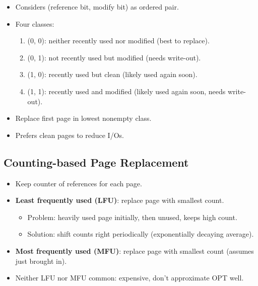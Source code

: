 \begin{itemize}
\begin{itemize}
        \item Considers (reference bit, modify bit) as ordered pair.
        \item Four classes:
        \begin{enumerate}
            \item (0, 0): neither recently used nor modified (best to replace).
            \item (0, 1): not recently used but modified (needs write-out).
            \item (1, 0): recently used but clean (likely used again soon).
            \item (1, 1): recently used and modified (likely used again soon, needs write-out).
        \end{enumerate}
        \item Replace first page in lowest nonempty class.
        \item Prefers clean pages to reduce I/Os.
    \end{itemize}
\end{itemize}

\subsection{Counting-based Page Replacement}
\begin{itemize}
    \item Keep counter of references for each page.
    \item \textbf{Least frequently used (LFU)}: replace page with smallest count.
    \begin{itemize}
        \item Problem: heavily used page initially, then unused, keeps high count.
        \item Solution: shift counts right periodically (exponentially decaying average).
    \end{itemize}
    \item \textbf{Most frequently used (MFU)}: replace page with smallest count (assumes just brought in).
    \item Neither LFU nor MFU common: expensive, don't approximate OPT well.
\end{itemize}

